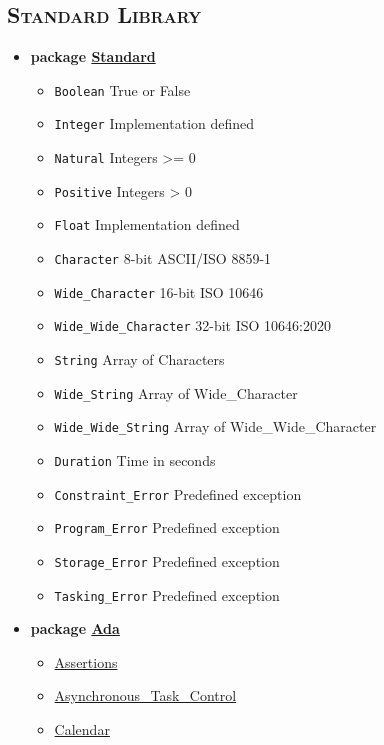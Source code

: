 \documentclass[english]{article}
\begin{document}
\begin{scriptsize}
\begin{multicols*}{5}
\section*{\textsc{Standard  Library}}

\begin{itemize}[leftmargin=0mm]
\item[] \textbf{package \href{http://www.ada-auth.org/standards/22rm/html/RM-A-1.html}{Standard}}
  \begin{itemize}[leftmargin=5mm]
  \item[] \texttt{Boolean} True or False
  \item[] \texttt{Integer} Implementation defined
  \item[] \texttt{Natural} Integers >= 0
  \item[] \texttt{Positive} Integers > 0
  \item[] \texttt{Float} Implementation defined
  \item[] \texttt{Character} 8-bit ASCII/ISO 8859-1
  \item[] \texttt{Wide\_Character} 16-bit ISO 10646
  \item[] \texttt{Wide\_Wide\_Character} 32-bit ISO 10646:2020
  \item[] \texttt{String} Array of Characters
  \item[] \texttt{Wide\_String} Array of Wide\_Character
  \item[] \texttt{Wide\_Wide\_String} Array of Wide\_Wide\_Character
  \item[] \texttt{Duration} Time in seconds
  \item[] \texttt{Constraint\_Error} Predefined exception
  \item[] \texttt{Program\_Error} Predefined exception
  \item[] \texttt{Storage\_Error} Predefined exception
  \item[] \texttt{Tasking\_Error} Predefined exception
  \end{itemize}
\item[] \textbf{package \href{http://www.ada-auth.org/standards/22rm/html/RM-A-2.html}{Ada}}
  \begin{itemize}[leftmargin=5mm]
  \item[] \href{http://www.ada-auth.org/standards/22rm/html/RM-11-4-2.html}{Assertions}
  \item[] \href{http://www.ada-auth.org/standards/22rm/html/RM-D-11.html}{Asynchronous\_Task\_Control}
  \item[] \href{http://www.ada-auth.org/standards/22rm/html/RM-9-6.html}{Calendar}

\end{itemize}
\end{itemize}
\end{multicols*}
\end{scriptsize}
\end{document}

